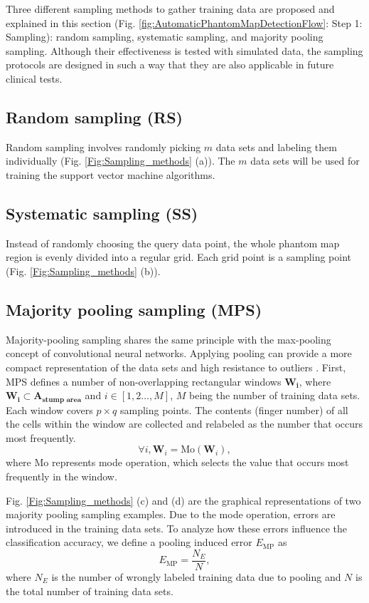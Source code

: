 Three different sampling methods to gather training data are proposed and explained in this section (Fig. \ref{fig:AutomaticPhantomMapDetectionFlow}: Step 1: Sampling): random sampling, systematic sampling, and majority pooling sampling. Although their effectiveness is tested with simulated data, the sampling protocols are designed in such a way that they are also applicable in future clinical tests.

\subsection{Random sampling (RS)}
Random sampling involves randomly picking $m$ data sets and  labeling  them individually (Fig. \ref{Fig:Sampling_methods} (a)). The $m$ data sets will be used for training the support vector machine algorithms. 


\subsection{Systematic sampling (SS)}
Instead of randomly choosing the query data point, the whole phantom map region is evenly divided into a regular grid. Each grid point is a sampling point (Fig. \ref{Fig:Sampling_methods} (b)). 

\subsection{Majority pooling sampling (MPS)}
\label{subsec:MPS}
Majority-pooling sampling shares the same principle with the max-pooling concept of convolutional neural networks.  
Applying pooling can provide a more compact representation of the data sets and high resistance to outliers \cite{boureau2010theoretical}.
First, MPS defines a number of non-overlapping rectangular windows $\boldsymbol{W_{i}}$, where $\boldsymbol{W_{i}} \subset \boldsymbol{A_{\text{stump area}}}$ and $i \in [1, 2 \dots, M]$, $M$ being the number of training data sets. Each window covers $p \times q$ sampling points.  The contents (finger number) of all the cells within the window are collected and relabeled as the number that occurs most frequently. 
\begin{equation}
\label{eq:MajorityPooling}
\forall i, \boldsymbol{W}_{i} = \text{Mo}(\boldsymbol{W}_{i}),
\end{equation}
where $\text{Mo}$ represents mode operation, which selects the value that occurs most frequently in the window.

Fig. \ref{Fig:Sampling_methods} (c) and (d) are the graphical representations of two majority pooling sampling examples.  Due to the mode operation, errors are introduced in the training data sets. To analyze how these errors influence the classification accuracy, we define a pooling induced error $E_{\text{MP}}$ as
\begin{equation}
\label{Eq:EMP}
 E_{\text{MP}} = \frac{N_E}{N},
\end{equation}
where $N_E$ is the number of wrongly labeled training data due to pooling and $N$ is the total number of training data sets.


